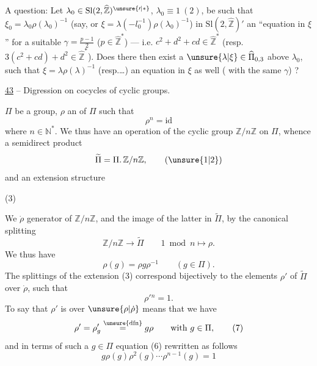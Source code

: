 A question: Let $\lambda_0\in\mathrm{Sl}(2,\widehat{\mathbb Z})^{\unsure{\prime|*}}$, $\lambda_0\equiv1\ (2)$, be such that $\xi_0=\lambda_0\rho(\lambda_0)^{-1}$ (say, or $\xi=\lambda(-l_0^{-1})\rho(\lambda_0)^{-1}$)   in $\mathrm{Sl}(2,\widehat{\mathbb Z})'$ an ``equation in $\xi$'' for a suitable $\gamma=\frac{p-1}{2}$ ($p\in\widehat{\mathbb Z}^{*}$) --- i.e. $c^2+d^2+cd\in\widehat{\mathbb Z}^{*}$ (resp. $3(c^2+cd)+d^2\in\widehat{\mathbb Z}^{*}$). Does there then exist a $\unsure{\lambda|\xi}\in\widehat{\Pi}_{0,3}$ above $\lambda_0$, such that $\xi=\lambda\rho(\lambda)^{-1}$ (resp.\ldots)  an equation in $\xi$ as well ( with the same $\gamma$) ?


\uline{43}  -- Digression on cocycles of cyclic groups.

 $\Pi$ be a group, $\rho$ an  of $\Pi$ such that
\[
\rho^n=\mathrm{id} \tag{1}
\]
where $n\in\mathbb N^*$. We thus have an operation of the cyclic group $\mathbb Z/n\mathbb Z$ on $\Pi$, whence a semidirect product
\[
\widetilde\Pi=\Pi.\,\mathbb Z/n\mathbb Z, \tag{\unsure{1|2}}
\]
and an extension structure

\begin{samepage}
(3) 
\end{samepage}

We  $\dot\rho$  generator of $\mathbb Z/n\mathbb Z$, and   the image of the latter in $\widetilde\Pi$, by the canonical splitting 
\[
\mathbb Z/n\mathbb Z\longrightarrow\widetilde\Pi\qquad 1\bmod n\longmapsto\rho. \tag{4}
\]
We thus have
\[
\rho(g)=\rho g\rho^{-1}\qquad(g\in\Pi). \tag{5}
\]
The splittings of the extension (3) correspond bijectively to the elements $\rho'$ of $\widetilde\Pi$ over $\dot\rho$, such that
\[
\rho'{}^n=1. \tag{6}
\]
To say that $\rho'$ is over $\unsure{\rho|\dot\rho}$ means that we have
\[
\rho'=\rho'_g\overset{\unsure{\mathrm{dfn}}}{=}g\rho\qquad\text{with }g\in\Pi, \tag{7}
\]
and in terms of such a $g\in\Pi$ equation (6)  rewritten as follows
\[
\boxed{g\rho(g)\rho^2(g)\cdots\rho^{n-1}(g)=1} \tag{8}
\]

